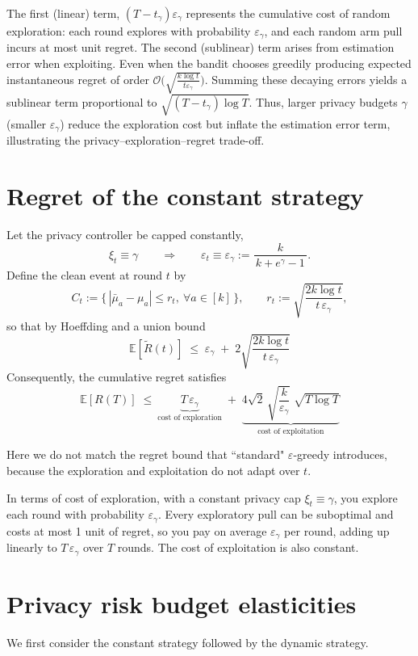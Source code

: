 \documentclass[mksc,nonblindrev]{informs3}
\begin{document}
\begin{APPENDICES}
The first (linear) term, $(T-t_\gamma)\varepsilon_\gamma$ represents the cumulative cost of random exploration: each round explores with probability $\varepsilon_\gamma$, and each random arm pull incurs at most unit regret. The second (sublinear) term arises from estimation error when exploiting. Even when the bandit chooses greedily producing expected instantaneous regret of order $\mathcal{O}\big(\sqrt{\frac{k\log t}{t\varepsilon_\gamma}}\big)$. Summing these decaying errors yields a sublinear term proportional to $\sqrt{(T-t_\gamma)\log T}$. Thus, larger privacy budgets $\gamma$ (smaller $\varepsilon_\gamma$) 
reduce the exploration cost but inflate the estimation error term, 
illustrating the privacy–exploration–regret trade-off.

\section{Regret of the constant strategy}\label{app:constant}
Let the privacy controller be capped constantly,
\[
\xi_t \equiv \gamma
\qquad\Longrightarrow\qquad
\varepsilon_t \equiv \varepsilon_\gamma := \frac{k}{\,k+e^{\gamma}-1\,}.
\]
Define the clean event at round $t$ by
\[
C_t := \bigl\{\,|\bar\mu_a-\mu_a|\le r_t,\ \forall a\in[k]\,\bigr\},
\qquad
r_t := \sqrt{\frac{2k\log t}{t\,\varepsilon_\gamma}},
\]
so that by Hoeffding and a union bound
\begin{equation}\label{unionboundd}
\mathbb{E}[\tilde R(t)]
\;\le\;
\varepsilon_\gamma
\;+\;
2\sqrt{\frac{2k\log t}{t\,\varepsilon_\gamma}}    
\end{equation}
Consequently, the cumulative regret satisfies
\[\;
\mathbb{E}[R(T)]
\;\le\
\underbrace{T\,\varepsilon_\gamma}_{\text{cost of exploration}}
\;+\;
\underbrace{4\sqrt{2}\,\sqrt{\frac{k}{\varepsilon_\gamma}}\;\sqrt{T\log T}}_{\text{cost of exploitation}}
\;
\]

Here we do not match the regret bound that ``standard" $\varepsilon$-greedy introduces, because the exploration and exploitation do not adapt over $t$.

In terms of cost of exploration, with a constant privacy cap $\xi_t\equiv\gamma$, you explore each round with probability $\varepsilon_\gamma$. Every exploratory pull can be suboptimal and costs at most 1 unit of regret, so you pay on average $\varepsilon_\gamma$ per round, adding up linearly to $T\,\varepsilon_\gamma$ over $T$ rounds. The cost of exploitation is also constant.

\section{Privacy risk budget elasticities}\label{web:elasticities}
We first consider the constant strategy followed by the dynamic strategy.

\end{APPENDICES}
\end{document}
